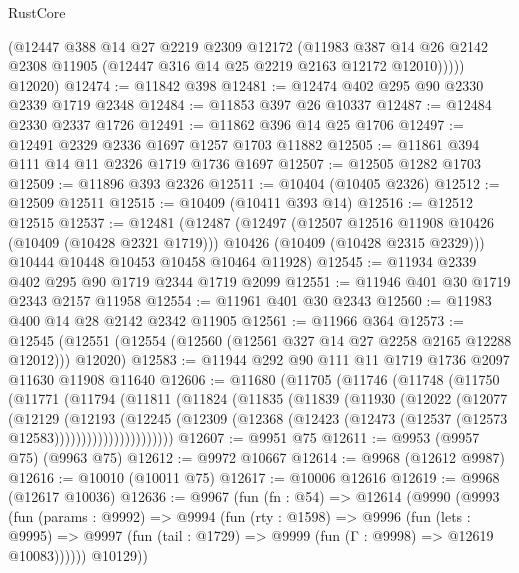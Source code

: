 \begin{lexlean}{RustCore}
\begin{coremodule}
          (@12447
            @388
            @14
            @27
            @2219
            @2309
            @12172
            (@11983
              @387
              @14
              @26
              @2142
              @2308
              @11905
              (@12447 @316 @14 @25 @2219 @2163 @12172 @12010)))))
      @12020)
@12474 := @11842 @398
@12481 := @12474 @402 @295 @90 @2330 @2339 @1719 @2348
@12484 := @11853 @397 @26 @10337
@12487 := @12484 @2330 @2337 @1726
@12491 := @11862 @396 @14 @25 @1706
@12497 := @12491 @2329 @2336 @1697 @1257 @1703 @11882
@12505 := @11861 @394 @111 @14 @11 @2326 @1719 @1736 @1697
@12507 := @12505 @1282 @1703
@12509 := @11896 @393 @2326
@12511 := @10404 (@10405 @2326)
@12512 := @12509 @12511
@12515 := @10409 (@10411 @393 @14)
@12516 := @12512 @12515
@12537 := @12481
    (@12487
      (@12497
        (@12507 @12516 @11908 @10426 (@10409 (@10428 @2321 @1719)))
        @10426
        (@10409 (@10428 @2315 @2329)))
      @10444
      @10448
      @10453
      @10458
      @10464
      @11928)
@12545 := @11934 @2339 @402 @295 @90 @1719 @2344 @1719 @2099
@12551 := @11946 @401 @30 @1719 @2343 @2157 @11958
@12554 := @11961 @401 @30 @2343
@12560 := @11983 @400 @14 @28 @2142 @2342 @11905
@12561 := @11966 @364
@12573 := @12545 (@12551 (@12554 (@12560 (@12561 @327 @14 @27 @2258 @2165 @12288 @12012))) @12020)
@12583 := @11944 @292 @90 @111 @11 @1719 @1736 @2097 @11630 @11908 @11640
@12606 := @11680
    (@11705
      (@11746
        (@11748
          (@11750
            (@11771
              (@11794
                (@11811
                  (@11824
                    (@11835
                      (@11839
                        (@11930
                          (@12022
                            (@12077
                              (@12129
                                (@12193
                                  (@12245
                                    (@12309
                                      (@12368
                                        (@12423 (@12473 (@12537 (@12573 @12583))))))))))))))))))))))
@12607 := @9951 @75
@12611 := @9953 (@9957 @75) (@9963 @75)
@12612 := @9972 @10667
@12614 := @9968 (@12612 @9987)
@12616 := @10010 (@10011 @75)
@12617 := @10006 @12616
@12619 := @9968 (@12617 @10036)
@12636 := @9967
    (fun (fn : @54) =>
    @12614
      (@9990
        (@9993
          (fun (params : @9992) =>
          @9994
            (fun (rty : @1598) =>
            @9996
              (fun (lets : @9995) =>
              @9997 (fun (tail : @1729) => @9999 (fun (Γ : @9998) => @12619 @10083))))))
        @10129))

\end{coremodule}
\end{lexlean}
